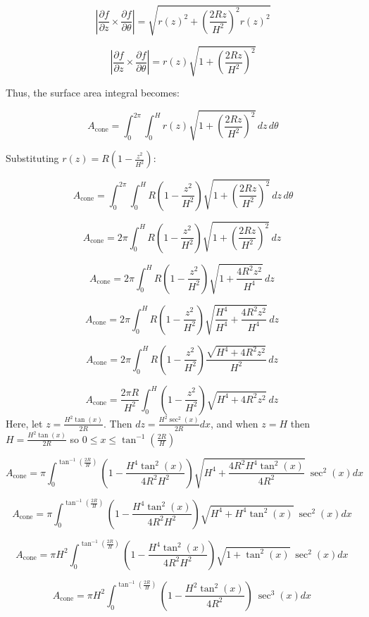 \documentclass{article}
\begin{document}
\[
\left| \frac{\partial f}{\partial z} \times \frac{\partial f}{\partial \theta} \right| = \sqrt{ r(z)^2 + \left( \frac{2Rz}{H^2} \right)^2 r(z)^2 }
\]


\[
\left| \frac{\partial f}{\partial z} \times \frac{\partial f}{\partial \theta} \right| = r(z) \sqrt{ 1 + \left( \frac{2Rz}{H^2} \right)^2 }
\]

Thus, the surface area integral becomes:

\[
A_{\text{cone}} = \int_0^{2\pi} \int_0^H r(z) \sqrt{ 1 + \left( \frac{2Rz}{H^2} \right)^2 } \, dz \, d\theta
\]

Substituting \( r(z) = R \left( 1 - \frac{z^2}{H^2} \right) \):

\[
A_{\text{cone}} = \int_0^{2\pi} \int_0^H R \left( 1 - \frac{z^2}{H^2} \right) \sqrt{ 1 + \left( \frac{2Rz}{H^2} \right)^2 } \, dz \, d\theta
\]

\[
A_{\text{cone}} = 2\pi \int_0^H R \left( 1 - \frac{z^2}{H^2} \right) \sqrt{ 1 + \left( \frac{2Rz}{H^2} \right)^2 } \, dz \
\]

\[
A_{\text{cone}} = 2\pi \int_0^H R \left( 1 - \frac{z^2}{H^2} \right) \sqrt{ 1 +  \frac{4R^2z^2}{H^4} } \, dz \
\]


\[
A_{\text{cone}} = 2\pi \int_0^H R \left( 1 - \frac{z^2}{H^2} \right) \sqrt{ \frac{H^4}{H^4} +  \frac{4R^2z^2}{H^4} } \, dz \
\]

\[
A_{\text{cone}} = 2\pi \int_0^H R \left( 1 - \frac{z^2}{H^2} \right) \frac{\sqrt{H^4 + 4R^2z^2}}{H^2}  \, dz \
\]

\[
A_{\text{cone}} = \frac{2\pi R}{H^2} \int_0^H \left( 1 - \frac{z^2}{H^2} \right) \sqrt{H^4 + 4R^2z^2} \ dz \
\]
Here, let $z = \frac{H^2 \tan (x)}{2R}$. Then $dz = \frac{H^2 \sec^2(x)}{2R} dx$, and when $z = H$ then $H = \frac{H^2 \tan(x)}{2R}$ so $0\leq x \leq \tan^{-1}(\frac{2R}{H})$



\[
A_{\text{cone}} = \pi \int_0^{\tan^{-1}(\frac{2R}{H})} \left( 1 - \frac{H^4\tan^2(x)}{4R^2H^2} \right) \sqrt{H^4 + \frac{4R^2H^4\tan^2(x)}{4R^2}} \ \sec^2(x)dx\
\]



\[
A_{\text{cone}} = \pi \int_0^{\tan^{-1}(\frac{2R}{H})} \left( 1 - \frac{H^4\tan^2(x)}{4R^2H^2} \right) \sqrt{H^4 + H^4\tan^2(x)} \ \sec^2(x)dx\
\]

\[
A_{\text{cone}} = \pi H^2 \int_0^{\tan^{-1}(\frac{2R}{H})} \left( 1 - \frac{H^4\tan^2(x)}{4R^2H^2} \right) \sqrt{1 + \tan^2(x)} \ \sec^2(x)dx\
\]


\[
A_{\text{cone}} = \pi H^2 \int_0^{\tan^{-1}(\frac{2R}{H})} \left( 1 - \frac{H^2\tan^2(x)}{4R^2} \right)  \ \sec^3(x)dx\
\]
\end{document}
